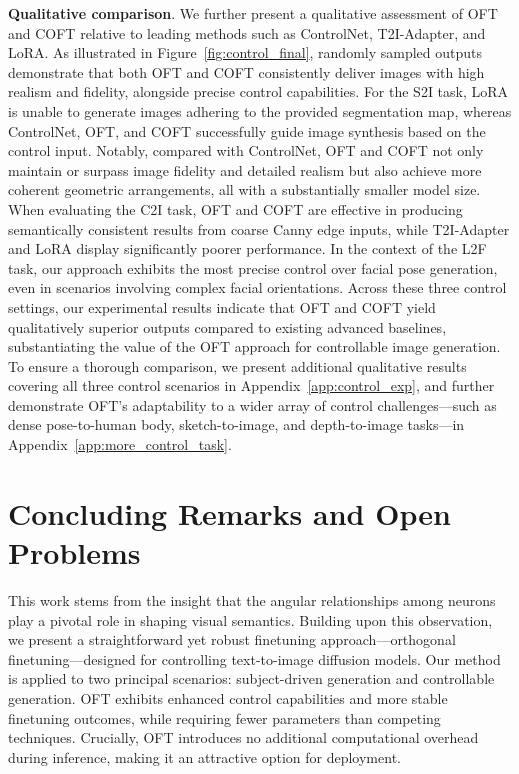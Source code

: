 \textbf{Qualitative comparison}. We further present a qualitative assessment of OFT and COFT relative to leading methods such as ControlNet, T2I-Adapter, and LoRA. As illustrated in Figure~\ref{fig:control_final}, randomly sampled outputs demonstrate that both OFT and COFT consistently deliver images with high realism and fidelity, alongside precise control capabilities. For the S2I task, LoRA is unable to generate images adhering to the provided segmentation map, whereas ControlNet, OFT, and COFT successfully guide image synthesis based on the control input. Notably, compared with ControlNet, OFT and COFT not only maintain or surpass image fidelity and detailed realism but also achieve more coherent geometric arrangements, all with a substantially smaller model size. When evaluating the C2I task, OFT and COFT are effective in producing semantically consistent results from coarse Canny edge inputs, while T2I-Adapter and LoRA display significantly poorer performance. In the context of the L2F task, our approach exhibits the most precise control over facial pose generation, even in scenarios involving complex facial orientations. Across these three control settings, our experimental results indicate that OFT and COFT yield qualitatively superior outputs compared to existing advanced baselines, substantiating the value of the OFT approach for controllable image generation. To ensure a thorough comparison, we present additional qualitative results covering all three control scenarios in Appendix~\ref{app:control_exp}, and further demonstrate OFT’s adaptability to a wider array of control challenges—such as dense pose-to-human body, sketch-to-image, and depth-to-image tasks—in Appendix~\ref{app:more_control_task}.

\section{Concluding Remarks and Open Problems}

This work stems from the insight that the angular relationships among neurons play a pivotal role in shaping visual semantics. Building upon this observation, we present a straightforward yet robust finetuning approach—orthogonal finetuning—designed for controlling text-to-image diffusion models. Our method is applied to two principal scenarios: subject-driven generation and controllable generation. OFT exhibits enhanced control capabilities and more stable finetuning outcomes, while requiring fewer parameters than competing techniques. Crucially, OFT introduces no additional computational overhead during inference, making it an attractive option for deployment.

